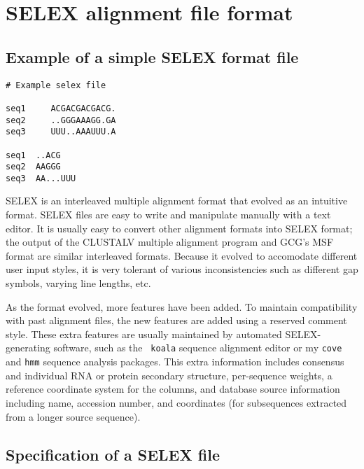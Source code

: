 \section{ SELEX alignment file format }

\subsection{ Example of a simple SELEX format file}

\begin{verbatim}
# Example selex file

seq1     ACGACGACGACG.
seq2     ..GGGAAAGG.GA
seq3     UUU..AAAUUU.A

seq1  ..ACG
seq2  AAGGG
seq3  AA...UUU
\end{verbatim}

SELEX is an interleaved multiple alignment format that evolved as an
intuitive format.  SELEX files are easy to write and manipulate
manually with a text editor.  It is usually easy to convert other
alignment formats into SELEX format; the output of the CLUSTALV
multiple alignment program and GCG's MSF format are similar
interleaved formats. Because it evolved to accomodate different user
input styles, it is very tolerant of various inconsistencies such as
different gap symbols, varying line lengths, etc.

As the format evolved, more features have been added. To maintain
compatibility with past alignment files, the new features are added
using a reserved comment style. These extra features are usually
maintained by automated SELEX-generating software, such as the {\tt
koala} sequence alignment editor or my {\tt cove} and {\tt hmm} sequence
analysis packages. This extra information includes consensus and
individual RNA or protein secondary structure, per-sequence weights, a
reference coordinate system for the columns, and database source
information including name, accession number, and coordinates (for
subsequences extracted from a longer source sequence).

\subsection {Specification of a SELEX file}

